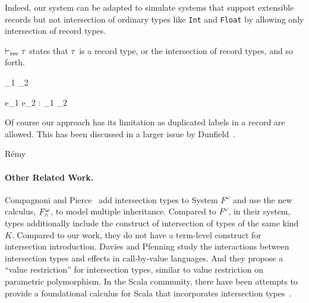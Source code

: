 
%

Indeed, our system can be adapted to simulate systems that support extensible
records but not intersection of ordinary types like \texttt{Int} and
\texttt{Float} by allowing only intersection of record types.

$ \vdash_{\textrm{rec}} \tau $ states that $ \tau $ is a record type, or the intersection of
record types, and so forth.


{\turnsrec \ty_1 \intersects \ty_2}

{\Gamma \turns e_1 \dcomma e_2 : \ty_1 \intersects \ty_2 }

Of course our approach has its limitation as duplicated labels in a record are
allowed. This has been discussed in a larger issue by
Dunfield~\cite{dunfield2014elaborating}.

R{\'e}my~\cite{remy1989type}

\paragraph{Other Related Work.}

Compagnoni and Pierce~\cite{compagnoni1996higher} add intersection types to
System $ F^{\omega} $ and use the new calculus, $ F^{\omega}_{\wedge} $, to
model multiple inheritance. Compared to $ F^{\omega} $, in their system, types
additionally include the construct of intersection of types of the same kind
$ K $. Compared to our work, they do not have a term-level construct for
intersection introduction. Davies and Pfenning \cite{davies2000intersection}
study the interactions between intersection types and effects in call-by-value
languages. And they propose a ``value restriction'' for intersection types,
similar to value restriction on parametric polymorphism. In the Scala community,
there have been attempts to provide a foundational calculus for Scala that
incorporates intersection types~\cite{amin2014foundations,amin2012dependent}.
